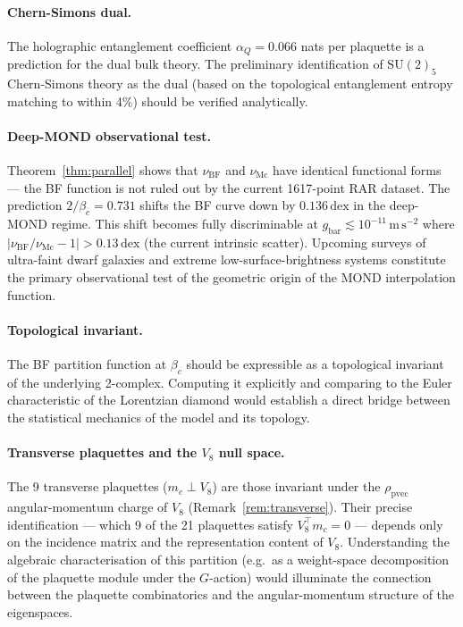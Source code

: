 \documentclass[12pt,a4paper]{article}
\theoremstyle{plain}
\theoremstyle{definition}
\newcommand{\betac}{\beta_c}
\newcommand{\nuBF}{\nu_{\mathrm{BF}}}
\newcommand{\nuMc}{\nu_{\mathrm{Mc}}}
\begin{document}
\paragraph{Chern-Simons dual.}
The holographic entanglement coefficient $\alpha_Q = 0.066$ nats per
plaquette is a prediction for the dual bulk theory.  The preliminary
identification of $\mathrm{SU}(2)_5$ Chern-Simons theory as the dual
(based on the topological entanglement entropy matching to within 4\%)
should be verified analytically.

\paragraph{Deep-MOND observational test.}
Theorem~\ref{thm:parallel} shows that $\nuBF$ and $\nuMc$ have
identical functional forms — the BF function is not ruled out by the
current 1617-point RAR dataset.  The prediction $2/\betac = 0.731$
shifts the BF curve down by $0.136\,\mathrm{dex}$ in the deep-MOND
regime.  This shift becomes fully discriminable at
$g_{\mathrm{bar}} \lesssim 10^{-11}\,\mathrm{m\,s^{-2}}$
where $|\nuBF/\nuMc - 1| > 0.13\,\mathrm{dex}$ (the current
intrinsic scatter).  Upcoming surveys of ultra-faint dwarf galaxies
and extreme low-surface-brightness systems constitute the primary
observational test of the geometric origin of the MOND interpolation
function.

\paragraph{Topological invariant.}
The BF partition function at $\betac$ should be expressible as a
topological invariant of the underlying 2-complex.  Computing it
explicitly and comparing to the Euler characteristic of the Lorentzian
diamond would establish a direct bridge between the statistical mechanics
of the model and its topology.

\paragraph{Transverse plaquettes and the $V_8$ null space.}
The 9 transverse plaquettes ($m_c \perp V_8$) are those invariant under
the $\rho_{\mathrm{pvec}}$ angular-momentum charge of $V_8$
(Remark~\ref{rem:transverse}).  Their precise identification — which 9
of the 21 plaquettes satisfy $V_8^\top m_c = 0$ — depends only on the
incidence matrix and the representation content of $V_8$.  Understanding
the algebraic characterisation of this partition (e.g.\ as a weight-space
decomposition of the plaquette module under the $G$-action) would
illuminate the connection between the plaquette combinatorics and the
angular-momentum structure of the eigenspaces.
\end{document}
